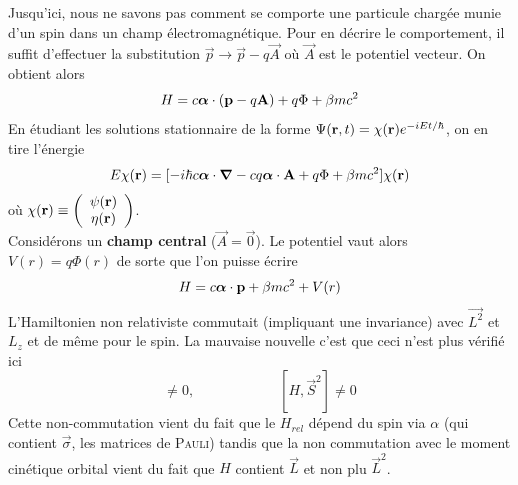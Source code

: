 Jusqu'ici, nous ne savons pas comment se comporte une particule chargée munie d'un spin dans un 
champ électromagnétique. Pour en décrire le comportement, il suffit d'effectuer la substitution
$\vec p \to \vec{p}-q\vec{A}$ où $\vec A$ est le potentiel vecteur. On obtient alors
\begin{equation}
H = 
c  \mbox{\boldmath $ \alpha $} \cdot  ( {\bf p} - q {\bf A} )
+ q \Phi + \beta m c^2
\end{equation}
En étudiant les solutions stationnaire de la forme $\Psi ({\bf r},t) = \chi({\bf r}) e^{-iEt/ \hbar}$,
on en tire l'énergie
\begin{equation}
E \chi({\bf r}) =
[ - i \hbar  c \mbox{\boldmath $ \alpha $} \cdot \mbox{\boldmath $ \nabla $}
- c q \mbox{\boldmath $ \alpha $} \cdot {\bf A} + q \Phi + \beta mc^2 ] \chi({\bf r})
\end{equation}
où $\displaystyle \chi ({\bf r}) \equiv \left( \begin{array}{c}
 \psi({\bf r}) \\ \eta({\bf r}) \end{array} \right)$.\\


Considérons un \textbf{champ central} ($\vec{A}=\vec0$). Le potentiel vaut alors $V(r)=q\Phi(r)$ de
sorte que l'on puisse écrire
\begin{equation}
H = 
c  \mbox{\boldmath $ \alpha $} \cdot  {\bf p}
 + \beta m c^2 + V(r)
\end{equation}
L'Hamiltonien non relativiste commutait (impliquant une invariance) avec $\vec{L^2}$ et $L_z$ et de
même pour le spin. La mauvaise nouvelle c'est que ceci n'est plus vérifié ici
\begin{equation}
[H,\vec{L}^2] \neq 0,\qquad\qquad\qquad [H,\vec{S}^2] \neq 0
\end{equation}
Cette non-commutation vient du fait que le $H_{rel}$ dépend du spin via $\alpha$ (qui contient 
$\vec \sigma$, les matrices de \textsc{Pauli}) tandis que la non commutation avec le moment cinétique
orbital vient du fait que $H$ contient $\vec{L}$ et non plu $\vec{L}^2$.\\

